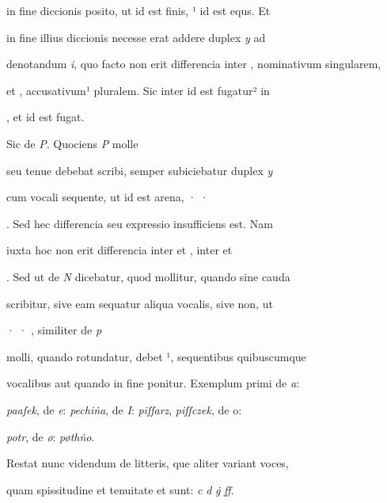  in fine diccionis posito, ut  id est finis, ¹ id est equs. Et 

in fine illius diccionis  necesse erat addere duplex \textit{y} ad 

denotandum \textit{i}, quo facto non erit differencia inter , nominativum singularem, 

et , accusativum¹ pluralem. Sic inter  id est fugatur² in 

\splitlines
{}, et  id est fugat.

\indentK Sic de \textit{P}. Quociens \textit{P} molle 

\fulllines
seu tenue debebat scribi, semper subiciebatur duplex \textit{y} 

cum vocali sequente, ut  id est arena, · · 

. Sed hec differencia seu expressio insufficiens est. Nam 

iuxta hoc non erit differencia inter  et , inter  et 

. Sed ut de \textit{N} dicebatur, quod mollitur, quando sine cauda 

scribitur, sive eam sequatur aliqua vocalis, sive non, ut 

 · · , similiter de \textit{p} 

molli, quando rotundatur, debet ¹, sequentibus quibuscumque 

vocalibus aut quando in fine ponitur. Exemplum primi de \textit{a}: 

\textit{paaſek}, de \textit{e}: \textit{pechiṅa}, de \textit{I}: \textit{piſſarz}, \textit{piſſczek}, de o\textit{}: 

\textit{potr}, de \textit{ø}: \textit{pøthṅo}. 

\indentP Restat nunc videndum de litteris, que aliter variant voces,

\splitlines
quam spissitudine et tenuitate et sunt: \textit{c} \textit{d} \textit{ġ} \textit{ﬀ}.

